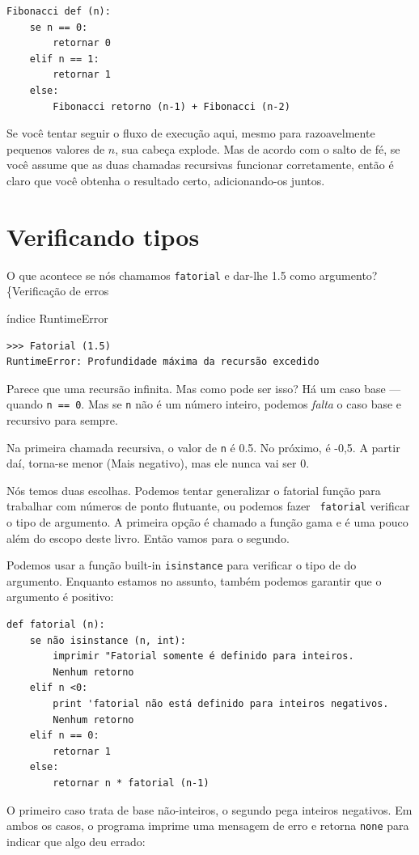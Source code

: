 \documentclass[10pt]{book}
\begin{document}
\begin{exercise}
{{{\begin{verbatim}
Fibonacci def (n):
    se n == 0:
        retornar 0
    elif n == 1:
        retornar 1
    else:
        Fibonacci retorno (n-1) + Fibonacci (n-2)
\end{verbatim}
%
Se você tentar seguir o fluxo de execução aqui, mesmo para razoavelmente
pequenos valores de $ n $, sua cabeça explode. Mas de acordo com o
salto de fé, se você assume que as duas chamadas recursivas
funcionar corretamente, então é claro que você obtenha
o resultado certo, adicionando-os juntos.


\section{Verificando tipos}
\label{guardião}

O que acontece se nós chamamos {\tt fatorial} e dar-lhe 1.5 como argumento?
\{Verificação de erros} índice
\index{} RuntimeError

\begin{verbatim}
>>> Fatorial (1.5)
RuntimeError: Profundidade máxima da recursão excedido
\end{verbatim}
%
Parece que uma recursão infinita. Mas como pode ser isso? Há um
caso base --- quando {\tt n == 0}. Mas se {\tt n} não é um número inteiro,
podemos {\em falta} o caso base e recursivo para sempre.

Na primeira chamada recursiva, o valor de {\tt n} é 0.5.
No próximo, é -0,5. A partir daí, torna-se menor
(Mais negativo), mas ele nunca vai ser 0.

Nós temos duas escolhas. Podemos tentar generalizar o fatorial {\tt}
função para trabalhar com números de ponto flutuante, ou podemos fazer {\tt
  fatorial} verificar o tipo de argumento. A primeira opção é
chamado a função gama e é uma
pouco além do escopo deste livro. Então vamos para o segundo.

Podemos usar a função built-in {\tt isinstance} para verificar o tipo de
do argumento. Enquanto estamos no assunto, também podemos garantir que o
argumento é positivo:

\begin{verbatim}
def fatorial (n):
    se não isinstance (n, int):
        imprimir "Fatorial somente é definido para inteiros.
        Nenhum retorno
    elif n <0:
        print 'fatorial não está definido para inteiros negativos.
        Nenhum retorno
    elif n == 0:
        retornar 1
    else:
        retornar n * fatorial (n-1)
\end{verbatim}
%
O primeiro caso trata de base não-inteiros, o
segundo pega inteiros negativos. Em ambos os casos, o programa imprime
uma mensagem de erro e retorna {\tt none} para indicar que algo
deu errado:

}}
\end{exercise}
\end{document}
